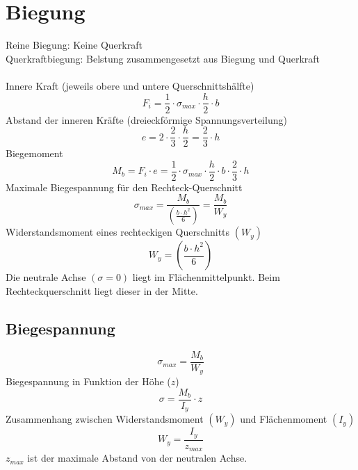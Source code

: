 



\section{Biegung}
Reine Biegung: Keine Querkraft\\
Querkraftbiegung: Belstung zusammengesetzt aus Biegung und Querkraft\\\\
Innere Kraft (jeweils obere und untere Querschnittshälfte)
\[ F_i = \frac{1}{2} \cdot \sigma_{max} \cdot \frac{h}{2} \cdot b \]
Abstand der inneren Kräfte (dreieckförmige Spannungsverteilung)
\[ e = 2 \cdot \frac{2}{3} \cdot \frac{h}{2} = \frac{2}{3} \cdot h \]
Biegemoment
\[ M_b = F_i \cdot e = \frac{1}{2} \cdot \sigma_{max} \cdot \frac{h}{2} \cdot b \cdot \frac{2}{3} \cdot h \]
Maximale Biegespannung für den Rechteck-Querschnitt
\[ \sigma_{max} = \frac{M_b}{\left(\frac{b \cdot h^2}{6}\right)} = \frac{M_b}{W_y} \]
Widerstandsmoment eines rechteckigen Querschnitts $(W_y)$
\[ W_y = \left(\frac{b \cdot h^2}{6}\right) \]
Die neutrale Achse $(\sigma = 0)$ liegt im Flächenmittelpunkt. Beim Rechteckquerschnitt liegt dieser in der Mitte. 

\subsection{Biegespannung}
\[ \sigma_{max} = \frac{M_b}{W_y} \]
Biegespannung in Funktion der Höhe ($z$)
\[ \sigma = \frac{M_b}{I_y} \cdot z \]
Zusammenhang zwischen Widerstandsmoment $(W_y)$ und Flächenmoment $(I_y)$
\[ W_y = \frac{I_y}{z_{max}} \]
$z_{max}$ ist der maximale Abstand von der neutralen Achse. 